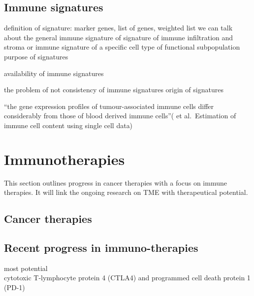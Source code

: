 \documentclass[12pt,]{book}
\theoremstyle{definition}
\theoremstyle{definition}
\theoremstyle{definition}
\theoremstyle{remark}
\begin{document}
\hypertarget{immune-signatures}{%
\subsection{Immune signatures}\label{immune-signatures}}

definition of signature: marker genes, list of genes, weighted list we
can talk about the general immune signature of signature of immune
infiltration and stroma or immune signature of a specific cell type of
functional subpopulation purpose of signatures

availability of immune signatures

the problem of not consistency of immune signatures origin of signatures

``the gene expression profiles of tumour-associated immune cells differ
considerably from those of blood derived immune cells''(\citet{Shelker}
et al.~Estimation of immune cell content using single cell data)

\hypertarget{immunotherapies}{%
\section{Immunotherapies}\label{immunotherapies}}

This section outlines progress in cancer therapies with a focus on
immune therapies. It will link the ongoing research on TME with
therapeutical potential.

\hypertarget{cancer-therapies}{%
\subsection{Cancer therapies}\label{cancer-therapies}}

\hypertarget{recent-progress-in-immuno-therapies}{%
\subsection{Recent progress in
immuno-therapies}\label{recent-progress-in-immuno-therapies}}

most potential\\
cytotoxic T-lymphocyte protein 4 (CTLA4) and programmed cell death
protein 1 (PD-1)
\end{document}
